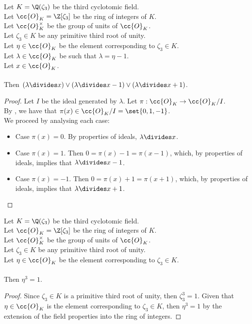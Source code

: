 \begin{lemma}
    \label{lmm:dvd_or_dvd_sub_one_or_dvd_add_one}
    \leanok
    Let $K = \Q(\zeta_3)$ be the third cyclotomic field. \\
    Let $\cc{O}_K = \Z[\zeta_3]$ be the ring of integers of $K$. \\
    Let $\cc{O}^\times_K$ be the group of units of $\cc{O}_K$. \\
    Let $\zeta_3 \in K$ be any primitive third root of unity. \\
    Let $\eta \in \cc{O}_K$ be the element corresponding to $\zeta_3 \in K$. \\
    Let $\lambda \in \cc{O}_K$ be such that $\lambda = \eta -1$. \\
    Let $x \in \cc{O}_K$. \\\\
    Then $(\lambda \divides x) \lor (\lambda \divides x-1) \lor (\lambda \divides x+1)$.
\end{lemma}
\begin{proof}
    \leanok
    Let $I$ be the ideal generated by $\lambda$. Let $\pi : \cc{O}_K \to \cc{O}_K / I$.\\
    By , we have that $\pi(x) \in \cc{O}_K / I = \set{0, 1, -1}$.\\
    We proceed by analysing each case:
    \begin{itemize}
        \item Case $\pi(x) = 0$. By properties of ideals, $\lambda \divides x$.
        \item Case $\pi(x) = 1$. Then $0=\pi(x)-1=\pi(x-1)$, which, by properties of ideals,
        implies that $\lambda \divides x-1$.
        \item Case $\pi(x) = -1$. Then $0=\pi(x)+1=\pi(x+1)$, which, by properties of ideals,
        implies that $\lambda \divides x+1$.
    \end{itemize}
\end{proof}

\begin{lemma}
    \label{lmm:toInteger_cube_eq_one}
    \leanok
    Let $K = \Q(\zeta_3)$ be the third cyclotomic field. \\
    Let $\cc{O}_K = \Z[\zeta_3]$ be the ring of integers of $K$. \\
    Let $\cc{O}^\times_K$ be the group of units of $\cc{O}_K$. \\
    Let $\zeta_3 \in K$ be any primitive third root of unity. \\
    Let $\eta \in \cc{O}_K$ be the element corresponding to $\zeta_3 \in K$. \\\\
    Then $\eta^3 = 1$.
\end{lemma}
\begin{proof}
    \leanok
    Since $\zeta_3 \in K$ is a primitive third root of unity, then $\zeta_3^3 = 1$.
    Given that $\eta \in \cc{O}_K$ is the element corresponding to $\zeta_3 \in K$, then
    $\eta^3 = 1$ by the extension of the field properties into the ring of integers.
\end{proof}

